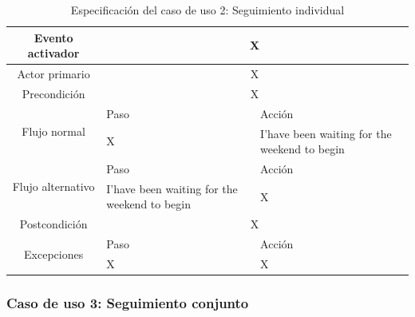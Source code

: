     \begin{table}[h]
        \centering
        \begin{tabularx}{\textwidth}{|c|X|X|}
            \hline
            Evento activador & \multicolumn{2}{|c|}{X} \\
            \hline
            Actor primario & \multicolumn{2}{|c|}{X} \\
            \hline
            Precondición & \multicolumn{2}{|c|}{X} \\
            \hline
            \multirow{2}{*}{Flujo normal} & Paso & Acción \\
            \cline{2-3} & X & I'have been waiting for the weekend to begin \\
            \hline
            \multirow{2}{*}{Flujo alternativo} & Paso & Acción \\
            \cline{2-3} & I'have been waiting for the weekend to begin & X \\
            \hline
            Postcondición & \multicolumn{2}{|c|}{X} \\
            \hline
            \multirow{2}{*}{Excepciones}  & Paso & Acción \\
            \cline{2-3} & X & X \\
            \hline
        \end{tabularx}
        \caption{Especificación del caso de uso 2: Seguimiento individual}
        \label{tabla:caso_uso_2}
    \end{table}
    
    \subsubsection{Caso de uso 3: Seguimiento conjunto}

